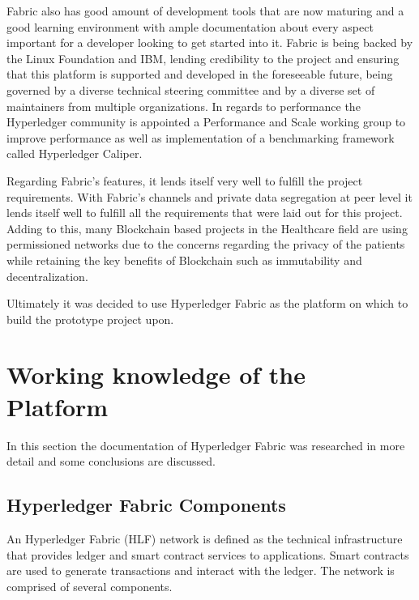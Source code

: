 Fabric also has good amount of development tools that are now maturing and a
good learning environment with ample documentation about every aspect important
for a developer looking to get started into it. Fabric is being backed by the
Linux Foundation and IBM, lending credibility to the project and ensuring that
this platform is supported and developed in the foreseeable future, being
governed by a diverse technical steering committee and by a diverse set of
maintainers from multiple organizations. In regards to performance the
Hyperledger community is appointed a Performance and Scale working group to
improve performance as well as implementation of a benchmarking framework
called Hyperledger Caliper.

Regarding Fabric's features, it lends itself very well to fulfill the project
requirements. With Fabric's channels and private data segregation at peer level
it lends itself well to fulfill all the requirements that were laid out for
this project. Adding to this, many Blockchain based projects in the Healthcare
field are using permissioned networks due to the concerns regarding the privacy
of the patients while retaining the key benefits of Blockchain such as
immutability and decentralization.

Ultimately it was decided to use Hyperledger Fabric as the platform on which to
build the prototype project upon.


\section{Working knowledge of the Platform}


In this section the documentation of Hyperledger Fabric was researched in more
detail and some conclusions are discussed.

\subsection{Hyperledger Fabric Components}

An Hyperledger Fabric (HLF) network is defined as the technical infrastructure
that provides ledger and smart contract services to applications. Smart
contracts are used to generate transactions and interact with the ledger. The
network is comprised of several components. 


